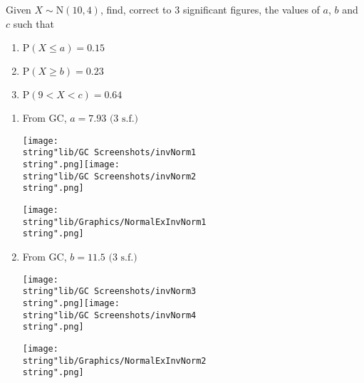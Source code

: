 \documentclass[11pt,a4paper]{book}
\begin{document}
\begin{example}

Given $X\sim\text{N}\left(10,4\right)$, find, correct to 3 significant
figures, the values of $a$, $b$ and $c$ such that

\begin{enumerate}[label=(\alph*)]

\item  $\text{P}\left(X\leq a\right)=0.15$

\item  $\text{P}\left(X\geq b\right)=0.23$

\item  $\text{P}\left(9<X<c\right)=0.64$

\end{enumerate}

\Solution

\begin{enumerate}[label=(\alph*)]

\item

\begin{minipage}[t]{.6\textwidth}

From GC, $a=7.93\text{ (3 s.f.)}$

\texttt{[image: \\string"lib/GC Screenshots/invNorm1\\string".png]}\hspace{1cm}\texttt{[image: \\string"lib/GC Screenshots/invNorm2\\string".png]}

\end{minipage}
\begin{minipage}[t]{.3\textwidth}
\begin{center}
\texttt{[image: \\string"lib/Graphics/NormalExInvNorm1\\string".png]}
\par\end{center}

\end{minipage}

\item  \begin{minipage}[t]{.6\textwidth}

From GC, $b=11.5\text{ (3 s.f.)}$

\texttt{[image: \\string"lib/GC Screenshots/invNorm3\\string".png]}\hspace{1cm}\texttt{[image: \\string"lib/GC Screenshots/invNorm4\\string".png]}

\end{minipage}
\begin{minipage}[t]{.3\textwidth}
\begin{center}
\texttt{[image: \\string"lib/Graphics/NormalExInvNorm2\\string".png]}
\par\end{center}


\end{minipage}
\end{enumerate}
\end{example}
\end{document}
